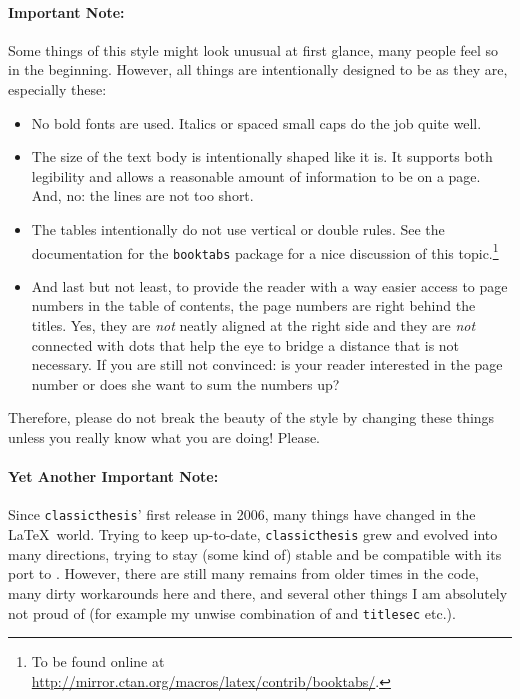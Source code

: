 \paragraph{Important Note:} Some things of this style might look
unusual at first glance, many people feel so in the beginning.
However, all things are intentionally designed to be as they are,
especially these:
\begin{itemize}
    \item No bold fonts are used. Italics or spaced small caps do the
    job quite well.
    \item The size of the text body is intentionally shaped like it
    is. It supports both legibility and allows a reasonable amount of
    information to be on a page. And, no: the lines are not too short.
    \item The tables intentionally do not use vertical or double
    rules. See the documentation for the \texttt{booktabs} package for
    a nice discussion of this topic.\footnote{To be found online at
    \url{http://mirror.ctan.org/macros/latex/contrib/booktabs/}.}
    \item And last but not least, to provide the reader with a way
    easier access to page numbers in the table of contents, the page
    numbers are right behind the titles. Yes, they are \emph{not}
    neatly aligned at the right side and they are \emph{not} connected
    with dots that help the eye to bridge a distance that is not
    necessary. If you are still not convinced: is your reader
    interested in the page number or does she want to sum the numbers
    up?
\end{itemize}
Therefore, please do not break the beauty of the style by changing
these things unless you really know what you are doing! Please.

\paragraph{Yet Another Important Note:} Since \texttt{classicthesis}'
first release in 2006, many things have changed in the \LaTeX\ world.
Trying to keep up-to-date, \texttt{classicthesis} grew and evolved
into many directions, trying to stay (some kind of) stable and be
compatible with its port to \mLyX. However, there are still many
remains from older times in the code, many dirty workarounds here and
there, and several other things I am absolutely not proud of (for
example my unwise combination of  and
\texttt{titlesec} etc.).

